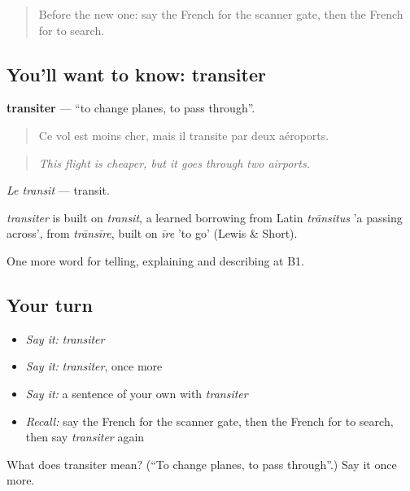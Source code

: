 \label{lesson:FR-C417-transiter}



\begin{quote}
Before the new one: say the French for the scanner gate, then the French for to search.
\end{quote}

\subsection*{You'll want to know: transiter}
\textbf{transiter} — \textquotedblleft{}to change planes, to pass through\textquotedblright{}.

\begin{quote}
Ce vol est moins cher, mais il transite par deux aéroports.
\end{quote}

\begin{quote}
\emph{This flight is cheaper, but it goes through two airports.}
\end{quote}

\emph{Le transit} — transit.

\begin{cousinweb}
\emph{transiter} is built on \emph{transit}, a learned borrowing from Latin \emph{trānsitus} 'a passing across', from \emph{trānsīre}, built on \emph{īre} 'to go' (Lewis \& Short).
\end{cousinweb}

\begin{grammarlens}[title={What you've built}]
One more word for telling, explaining and describing at B1.
\end{grammarlens}

\subsection*{Your turn}
\begin{itemize}
\raggedright
  \item \emph{Say it:} \emph{transiter}
  \item \emph{Say it:} \emph{transiter}, once more
  \item \emph{Say it:} a sentence of your own with \emph{transiter}
  \item \emph{Recall:} say the French for the scanner gate, then the French for to search, then say \emph{transiter} again
\end{itemize}

\begin{tcolorbox}[breakable,colback=teal!4,colframe=teal!35!black,title={Before you move on}]
What does transiter mean? (\textquotedblleft{}To change planes, to pass through\textquotedblright{}.) Say it once more.
\end{tcolorbox}
